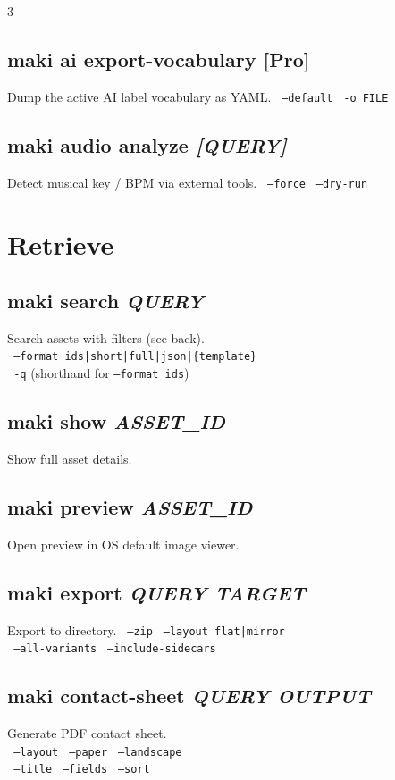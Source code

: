 \documentclass[a4paper,landscape,8pt]{article}
\newcommand{\cmd}[1]{\texttt{\footnotesize #1}}
\newcommand{\opt}[1]{\texttt{\scriptsize\color{maki-stone} #1}}
\newcommand{\pro}{\textcolor{maki-teal}{\scriptsize [Pro]}}
\begin{document}
\begin{multicols}{3}
\subsection{maki ai export-vocabulary \pro}
Dump the active AI label vocabulary as YAML. \opt{--default} \opt{-o FILE}

\subsection{maki audio analyze \textit{[QUERY]}}
Detect musical key / BPM via external tools. \opt{--force} \opt{--dry-run}

\section{Retrieve}

\subsection{maki search \textit{QUERY}}
Search assets with filters (see back). \\
\opt{--format ids|short|full|json|\{template\}} \\
\opt{-q} (shorthand for \cmd{--format ids})

\subsection{maki show \textit{ASSET\_ID}}
Show full asset details.

\subsection{maki preview \textit{ASSET\_ID}}
Open preview in OS default image viewer.

\subsection{maki export \textit{QUERY TARGET}}
Export to directory. \opt{--zip} \opt{--layout flat|mirror} \\
\opt{--all-variants} \opt{--include-sidecars}

\subsection{maki contact-sheet \textit{QUERY OUTPUT}}
Generate PDF contact sheet. \\
\opt{--layout} \opt{--paper} \opt{--landscape} \\
\opt{--title} \opt{--fields} \opt{--sort}


\end{multicols}
\end{document}
